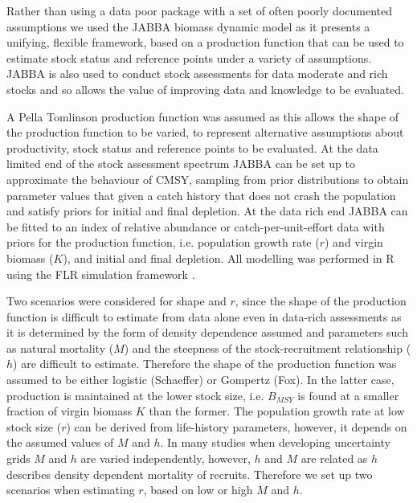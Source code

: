 
Rather than using a data poor package with a set of often poorly documented assumptions we used the JABBA biomass dynamic model \citep{winker2018jabba} as it presents a unifying, flexible framework, based on a production function that can be used to estimate stock status and reference points under a variety of assumptions. JABBA is also used to conduct stock assessments for data moderate and rich stocks and so allows the value of improving data and knowledge to be evaluated.  


A Pella Tomlinson production function \citep{pella1969generalized} was assumed as this allows the shape of the production function to be varied, to represent alternative assumptions about productivity, stock status and reference points to be evaluated. At the data limited end of the stock assessment spectrum JABBA can be set up to approximate the behaviour of CMSY\cite{froese2017estimating}, sampling from prior distributions to obtain parameter values that given a catch history that does not crash the population and satisfy priors for initial and final depletion. At the data rich end JABBA can be fitted to an index of relative abundance or catch-per-unit-effort data with priors for the production function, i.e. population growth rate ($r$) and virgin biomass ($K$), and initial and final depletion. All modelling was performed in R using the FLR simulation framework \citep{kell2007flr}.


Two scenarios were considered for shape and $r$, since the shape of the production function is difficult to estimate from data alone even in data-rich assessments as it is determined by the form of density dependence assumed and parameters such as natural mortality ($M$) and the steepness of the stock-recruitment relationship ($h$) are difficult to estimate. Therefore the shape of the production function was assumed to be either logistic (Schaeffer) or Gompertz (Fox). In the latter case, production is maintained at the lower stock size, i.e. $B_{MSY}$ is found at a smaller fraction of virgin biomass $K$ than the former. The population growth rate at low stock size ($r$) can be derived from life-history parameters, however, it depends on the assumed values of $M$ and $h$. In many studies when developing uncertainty grids $M$ and $h$ are varied independently,  however, $h$ and $M$ are related as $h$ describes density dependent mortality of recruits. Therefore we set up two scenarios when estimating $r$, based on low or high $M$ and $h$.

